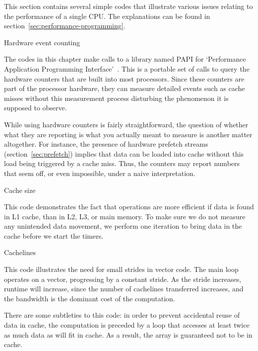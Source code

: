 This section contains several simple codes that illustrate various
issues relating to the performance of a single CPU. The explanations
can be found in section~\ref{sec:performance-programming}.

 {Hardware event counting}
\label{sec:papi}

The codes in this chapter make calls to a library named PAPI for
`Performance Application Programming
Interface'~\cite{papi,papi-homepage}. This is a portable set of calls
to query the hardware counters that are built into most
processors. Since these counters are part of the processor hardware,
they can measure detailed events such as cache misses without this
measurement process disturbing the phenomenon it is supposed to
observe.

While using hardware counters is fairly straightforward, the question
of whether what they are reporting is what you actually meant to
measure is another matter altogether. For instance, the presence of
hardware prefetch streams (section~\ref{sec:prefetch}) implies that
data can be loaded into cache without this load being triggered by a
cache miss. Thus, the counters may report numbers that seem off, or
even impossible, under a naive interpretation.

 {Cache size}
\label{sec:cachesize-code}

This code demonstrates the fact that operations are more efficient if
data is found in L1 cache, than in L2, L3, or main memory. To make
sure we do not measure any unintended data movement, we perform one
iteration to bring data in the cache before we start the timers.

\begingroup\small

\endgroup

 {Cachelines}
\label{sec:cacheline-code}

This code illustrates the need for small strides in vector code. The
main loop operates on a vector, progressing by a constant stride. As
the stride increases, runtime will increase, since the number of
cachelines transferred increases, and the bandwidth is the dominant
cost of the computation.

There are some subtleties to this code: in order to prevent accidental
reuse of data in cache, the computation is preceded by a loop that
accesses at least twice as much data as will fit in cache. As a
result, the array is guaranteed not to be in cache.

\begingroup\small

\endgroup

